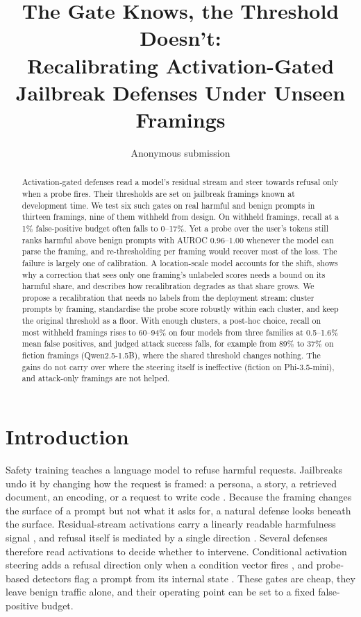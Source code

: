\documentclass[11pt]{article}
\title{The Gate Knows, the Threshold Doesn't:\\Recalibrating Activation-Gated Jailbreak Defenses Under Unseen Framings}
\author{Anonymous submission}
\begin{document}
\maketitle

\begin{abstract}
Activation-gated defenses read a model's residual stream and steer towards refusal only when a probe fires. Their thresholds are set on jailbreak framings known at development time. We test six such gates on real harmful and benign prompts in thirteen framings, nine of them withheld from design. On withheld framings, recall at a 1\% false-positive budget often falls to 0--17\%. Yet a probe over the user's tokens still ranks harmful above benign prompts with AUROC 0.96--1.00 whenever the model can parse the framing, and re-thresholding per framing would recover most of the loss. The failure is largely one of calibration. A location-scale model accounts for the shift, shows why a correction that sees only one framing's unlabeled scores needs a bound on its harmful share, and describes how recalibration degrades as that share grows. We propose a recalibration that needs no labels from the deployment stream: cluster prompts by framing, standardise the probe score robustly within each cluster, and keep the original threshold as a floor. With enough clusters, a post-hoc choice, recall on most withheld framings rises to 60--94\% on four models from three families at 0.5--1.6\% mean false positives, and judged attack success falls, for example from 89\% to 37\% on fiction framings (Qwen2.5-1.5B), where the shared threshold changes nothing. The gains do not carry over where the steering itself is ineffective (fiction on Phi-3.5-mini), and attack-only framings are not helped.
\end{abstract}

\section{Introduction}

Safety training teaches a language model to refuse harmful requests. Jailbreaks undo it by changing how the request is framed: a persona, a story, a retrieved document, an encoding, or a request to write code \citep{wei2023jailbroken,shen2024dan,greshake2023indirect,li2023deepinception}. Because the framing changes the surface of a prompt but not what it asks for, a natural defense looks beneath the surface. Residual-stream activations carry a linearly readable harmfulness signal \citep{zou2023repe,zhao2025harmfulness}, and refusal itself is mediated by a single direction \citep{arditi2024refusal}. Several defenses therefore read activations to decide whether to intervene. Conditional activation steering adds a refusal direction only when a condition vector fires \citep{lee2025cast}, and probe-based detectors flag a prompt from its internal state \citep{zhang2025jbshield,mckenzie2025highstakes}. These gates are cheap, they leave benign traffic alone, and their operating point can be set to a fixed false-positive budget.
\end{document}

